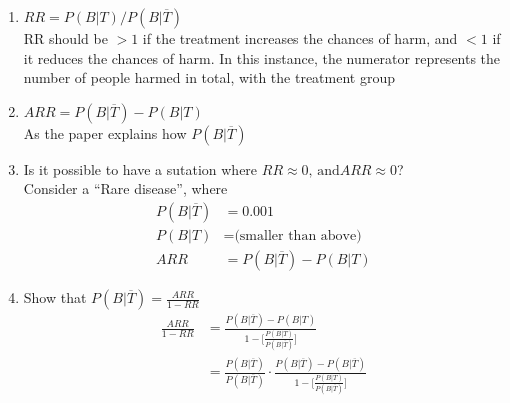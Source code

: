 \documentclass{article}
\begin{document}
\begin{enumerate}[label=\alph*)]
    \item \(RR = P(B \vert T) / P(B \vert \overline{T})\) \\
          RR should be \(> 1\) if the treatment increases the chances of harm, and \(< 1\) if it reduces the chances of harm.
          In this instance, the numerator represents the number of people harmed in total, with the treatment group
    \item \(ARR = P(B \vert \overline{T}) - P(B \vert T)\) \\
          As the paper explains how \(P(B \vert \overline{T})\)
    \item Is it possible to have a sutation where \(RR \approx 0 \text{, and} ARR \approx 0\)? \\
          Consider a ``Rare disease'', where
          \begin{align*}
              P(B \vert \overline{T}) & = 0.001                                  \\
              P(B \vert T)            & = \text{(smaller than above)}            \\
              ARR                     & = P(B \vert \overline{T}) - P(B \vert T)
          \end{align*}
    \item Show that \(P(B \vert \overline{T}) = \frac{ARR}{1-RR}\)
          \begin{align*}
              \frac{
                  ARR
              }{
                  1-RR
              } & =
              \frac{
                  P(B \vert \overline{T}) - P(B \vert T)
              }
              {
                  1 - \lbrack
                  \frac{
                      P (B \vert T)
                  }{
                      P(B \vert \overline{T})
                  } \rbrack
              }     \\
                & =
              \frac{
                  P(B \vert \overline{T})
              }
              {
                  P(B \vert \overline{T})
              } \cdot
              \frac{
                  P(B \vert \overline{T}) - P(B \vert \overline{T})
              }
              {
                  1 - \lbrack \frac{
                      P (B \vert T)
                  }
                  {
                      P (B \vert \overline{T})
                  } \rbrack
              }
          \end{align*}
\end{enumerate}
\end{document}

